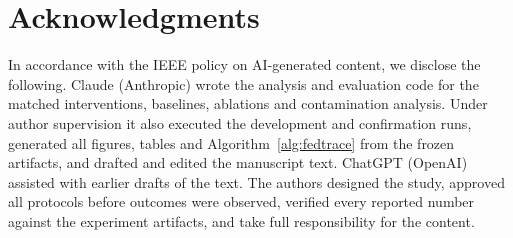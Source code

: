 \documentclass{article}
\begin{document}
\section{Acknowledgments}
In accordance with the IEEE policy on AI-generated content, we disclose the following. Claude (Anthropic) wrote the
analysis and evaluation code for the matched interventions, baselines, ablations and contamination analysis. Under
author supervision it also executed the development and confirmation runs, generated all figures, tables and
Algorithm~\ref{alg:fedtrace} from the frozen artifacts, and drafted and edited the manuscript text. ChatGPT (OpenAI)
assisted with earlier drafts of the text. The authors designed the study, approved all protocols before outcomes
were observed, verified every reported number against the experiment artifacts, and take full responsibility for
the content.



\end{document}
